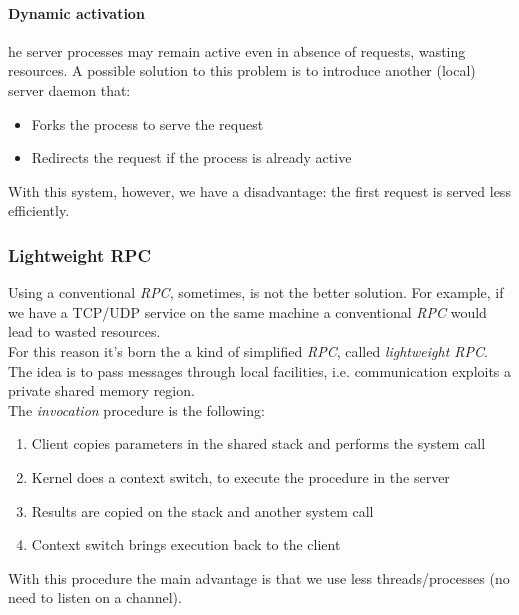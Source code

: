 \paragraph{Dynamic activation}
he server processes may remain active even in absence of requests, wasting resources. A possible solution to this problem is to introduce another (local) server daemon that:
\begin{itemize}
    \item Forks the process to serve the request
    \item Redirects the request if the process is already active
\end{itemize}
With this system, however, we have a disadvantage: the first request is served less efficiently.

\subsubsection{Lightweight RPC}
Using a conventional \textit{RPC}, sometimes, is not the better solution. For example, if we have a TCP/UDP service on the same machine a conventional \textit{RPC} would lead to wasted resources.\\
For this reason it's born the a kind of simplified \textit{RPC}, called \textit{lightweight RPC}.\\
The idea is to pass messages through local facilities, i.e. communication exploits a private shared memory region.\\
The \textit{invocation} procedure is the following:
\begin{enumerate}
    \item Client copies parameters in the shared stack and performs the system call
    \item Kernel does a context switch, to execute the procedure in the server
    \item Results are copied on the stack and another system call
    \item Context switch brings execution back to the client
\end{enumerate}
With this procedure the main advantage is that we use less threads/processes (no need to listen on a channel).

